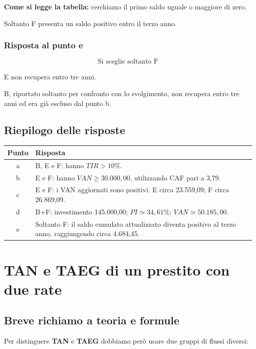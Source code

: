 \noindent \textbf{Come si legge la tabella:}
cerchiamo il primo saldo
uguale o maggiore di zero.

\noindent Soltanto F presenta
un saldo positivo entro il terzo anno.


\subsubsection*{Risposta al punto e}

\[
\boxed{
\text{Si sceglie soltanto F}
}
\]

\noindent E non recupera entro tre anni.

\noindent B, riportato soltanto
per confronto con lo svolgimento,
non recupera entro tre anni
ed era già escluso dal punto b.


\subsection{Riepilogo delle risposte}

\begin{center}
    \begin{tabular}{|c|p{9cm}|}
        \hline
        \textbf{Punto} & \textbf{Risposta} \\
        \hline
        a &
        B, E e F:
        hanno $TIR>10\%$. \\
        \hline
        b &
        E e F:
        hanno $VAN\geq30.000{,}00$,
        utilizzando CAF pari a 3,79. \\
        \hline
        c &
        E e F:
        i VAN aggiornati sono positivi.
        E circa 23.559,09;
        F circa 26.869,09. \\
        \hline
        d &
        B+F:
        investimento 145.000,00;
        $PI\simeq34{,}61\%$;
        $VAN\simeq50.185{,}00$. \\
        \hline
        e &
        Soltanto F:
        il saldo cumulato attualizzato
        diventa positivo al terzo anno,
        raggiungendo circa 4.684,45. \\
        \hline
    \end{tabular}
\end{center}
\newpage 
\section{TAN e TAEG di un prestito con due rate}

\subsection*{Breve richiamo a teoria e formule}
\noindent Per distinguere \textbf{TAN} e \textbf{TAEG}
dobbiamo però usare due gruppi di flussi diversi:

